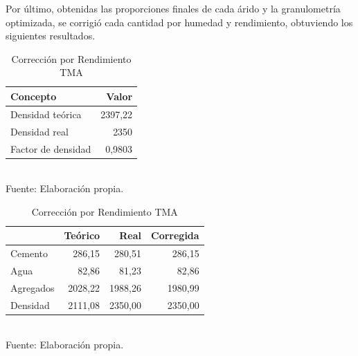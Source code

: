 Por último, obtenidas las proporciones finales de cada árido y la granulometría optimizada, se corrigió cada cantidad por humedad y rendimiento, obtuviendo los siguientes resultados.

\begin{table}[H]
\centering
\caption{Rendimiento de mezcla y factor de densidad}
\label{tab:rend-y-factor}
\small
\setlength{\tabcolsep}{6pt}
\renewcommand{\arraystretch}{1.15}

\begin{subtable}[t]{0.38\textwidth}
\centering
\caption{Densidades}
\label{tab:factor-rendimiento}
\begin{tabular}{lr}
\toprule
\textbf{Concepto} & \textbf{Valor} \\
\midrule
Densidad teórica & 2397,22 \\
Densidad real    & 2350 \\
Factor de densidad          & 0,9803 \\
\bottomrule
\end{tabular}
\\Fuente: Elaboración propia.
\end{subtable}
\begin{subtable}[t]{0.58\textwidth}
\centering
\caption{Corrección por Rendimiento TMA}
\label{tab:rendimiento}
\begin{tabular}{lrrr}
\toprule
 & \textbf{Teórico} & \textbf{Real} & \textbf{Corregida} \\
\midrule
Cemento   & 286,15 & 280,51 & 286,15 \\
Agua      & 82,86  & 81,23  & 82,86  \\
Agregados & 2028,22 & 1988,26 & 1980,99 \\
Densidad  & 2111,08 & 2350,00 & 2350,00 \\
\bottomrule
\end{tabular}
\\Fuente: Elaboración propia.
\end{subtable}


\end{table}


